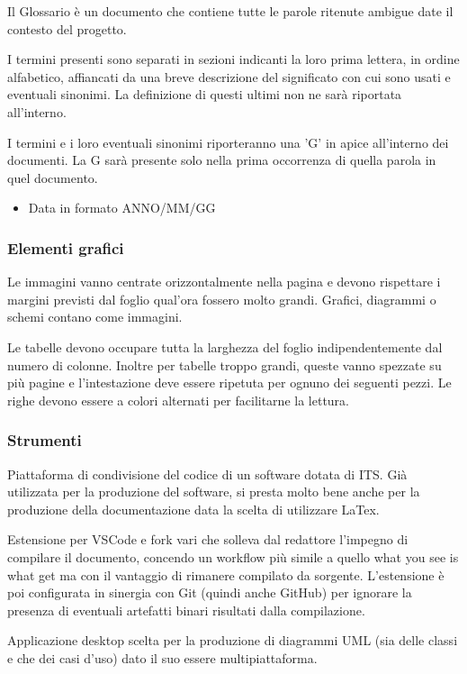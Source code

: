 
    Il Glossario è un documento che contiene tutte le parole ritenute ambigue date il contesto del progetto.

    I termini presenti sono separati in sezioni indicanti la loro prima lettera, in ordine alfabetico, affiancati
    da una breve descrizione del significato con cui sono usati e eventuali sinonimi.
    La definizione di questi ultimi non ne sarà riportata all'interno.

    I termini e i loro eventuali sinonimi riporteranno una 'G' in apice all'interno dei documenti. La G sarà
    presente solo nella prima occorrenza di quella parola in quel documento.

    \begin{itemize}
    \item Data in formato ANNO/MM/GG
    \end{itemize}

\subsubsection{Elementi grafici}

    Le immagini vanno centrate orizzontalmente nella pagina e devono rispettare i margini previsti dal foglio qual'ora
    fossero molto grandi.
    Grafici, diagrammi o schemi contano come immagini.

    Le tabelle devono occupare tutta la larghezza del foglio indipendentemente dal numero di colonne.
    Inoltre per tabelle troppo grandi, queste vanno spezzate su più pagine e l'intestazione deve essere ripetuta
    per ognuno dei seguenti pezzi.
    Le righe devono essere a colori alternati per facilitarne la lettura.

\subsubsection{Strumenti}

    Piattaforma di condivisione del codice di un software dotata di ITS. Già utilizzata per la produzione del software, si presta
    molto bene anche per la produzione della documentazione data la scelta di utilizzare LaTex.

    Estensione per VSCode e fork vari che solleva dal redattore l'impegno di compilare il documento, concendo un workflow più simile
    a quello what you see is what get ma con il vantaggio di rimanere compilato da sorgente.
    L'estensione è poi configurata in sinergia con Git (quindi anche GitHub) per ignorare la presenza di eventuali artefatti binari
    risultati dalla compilazione.

    Applicazione desktop scelta per la produzione di diagrammi UML (sia delle classi e che dei casi d'uso) dato il suo essere
    multipiattaforma.
